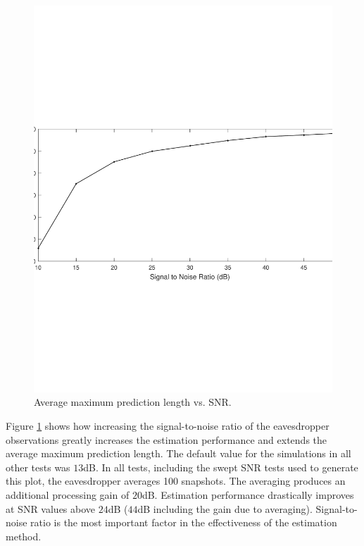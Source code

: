 \documentclass{allertonproc}
\begin{document}
\begin{figure}[tbp]
\begin{center}
\includegraphics[width=6in]{signalToNoise}
\caption{Average maximum prediction length vs. SNR. }\label{SNR}
\end{center}
\end{figure}
Figure \ref{SNR} shows how increasing the signal-to-noise ratio of the eavesdropper observations greatly increases the estimation performance and extends the average maximum prediction length. The default value for the simulations in all other tests was $13$dB. In all tests, including the swept SNR tests used to generate this plot, the eavesdropper averages 100 snapshots. The averaging produces an additional processing gain of $20$dB. Estimation performance drastically improves at SNR values above $24$dB ($44$dB including the gain due to averaging). Signal-to-noise ratio is the most important factor in the effectiveness of the estimation method.
\end{document}

